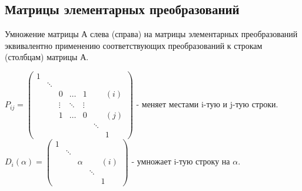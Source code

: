 \subsection{Матрицы элементарных преобразований}
\begin{theor}
Умножение матрицы А слева (справа) на матрицы элементарных преобразований
эквивалентно применению соответствующих преобразований к строкам (столбцам)
матрицы А.
\end{theor}
$P_{ij}=\left(
\begin{array}{ccccccc}
1&&&&&&\\
&\ddots&&&&&\\
&&0&\ldots&1&&(i)\\
&&\vdots&\ddots&\vdots&&\\
&&1&\ldots&0&&(j)\\
&&&&&\ddots&\\
&&&&&&1
\end{array}
\right)$ - меняет местами i-тую и j-тую строки.\\
$D_i(\alpha)=
\left(\begin{array}{ccccc}
1&&&&\\
&\ddots&&&\\
&&\alpha&&(i)\\
&&&\ddots&\\
&&&&1
\end{array}\right)
$ - умножает i-тую строку на $\alpha$.\\

